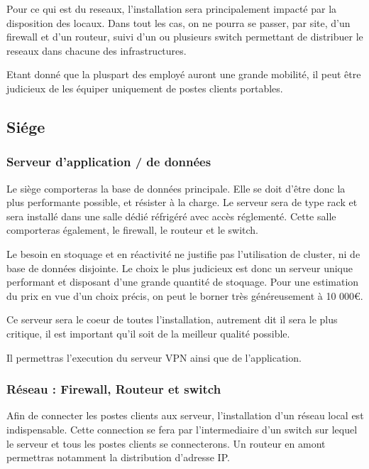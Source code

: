    Pour ce qui est du reseaux, l'installation sera principalement impacté par la disposition des locaux.
    Dans tout les cas, on ne pourra se passer, par site, d'un firewall et d'un routeur, suivi d'un ou plusieurs switch permettant de distribuer le reseaux dans chacune des infrastructures.

    Etant donné que la pluspart des employé auront une grande mobilité, il peut être judicieux de les équiper uniquement de postes clients portables.

    \subsection{Siége}

        \subsubsection{Serveur d'application / de données}
            Le siège comporteras la base de données principale. Elle se doit d'être donc la plus performante possible, et résister à la charge.
            Le serveur sera de type rack et sera installé dans une salle dédié réfrigéré avec accès réglementé.
            Cette salle comporteras également, le firewall, le routeur et le switch.

            Le besoin en stoquage et en réactivité ne justifie pas l'utilisation de cluster, ni de base de données disjointe.
            Le choix le plus judicieux est donc un serveur unique performant et disposant d'une grande quantité de stoquage.
            Pour une estimation du prix en vue d'un choix précis, on peut le borner très généreusement à 10 000€.

            Ce serveur sera le coeur de toutes l'installation, autrement dit il sera le plus critique, il est important qu'il soit de la meilleur qualité possible.

            Il permettras l'execution du serveur VPN ainsi que de l'application.

        \subsubsection{Réseau : Firewall, Routeur et switch}
            Afin de connecter les postes clients aux serveur, l'installation d'un réseau local est indispensable.
            Cette connection se fera par l'intermediaire d'un switch sur lequel le serveur et tous les postes clients se connecterons.
            Un routeur en amont permettras notamment la distribution d'adresse IP.

